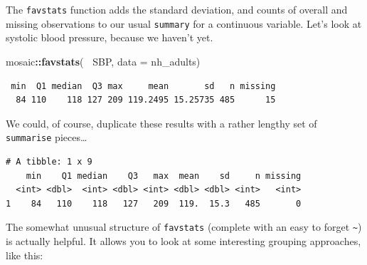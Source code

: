\documentclass[
]{book}
\newenvironment{Shaded}{\begin{snugshade}}{\end{snugshade}}
\newcommand{\DataTypeTok}[1]{\textcolor[rgb]{0.13,0.29,0.53}{#1}}
\newcommand{\FloatTok}[1]{\textcolor[rgb]{0.00,0.00,0.81}{#1}}
\newcommand{\KeywordTok}[1]{\textcolor[rgb]{0.13,0.29,0.53}{\textbf{#1}}}
\newcommand{\NormalTok}[1]{#1}
\newcommand{\OperatorTok}[1]{\textcolor[rgb]{0.81,0.36,0.00}{\textbf{#1}}}
\newcommand{\StringTok}[1]{\textcolor[rgb]{0.31,0.60,0.02}{#1}}
\begin{document}
The \texttt{favstats} function adds the standard deviation, and counts of overall and missing observations to our usual \texttt{summary} for a continuous variable. Let's look at systolic blood pressure, because we haven't yet.

\begin{Shaded}
\begin{Highlighting}[]
\NormalTok{mosaic}\OperatorTok{::}\KeywordTok{favstats}\NormalTok{(}\OperatorTok{~}\StringTok{ }\NormalTok{SBP, }\DataTypeTok{data =}\NormalTok{ nh_adults)}
\end{Highlighting}
\end{Shaded}

\begin{verbatim}
 min  Q1 median  Q3 max     mean       sd   n missing
  84 110    118 127 209 119.2495 15.25735 485      15
\end{verbatim}

We could, of course, duplicate these results with a rather lengthy set of \texttt{summarise} pieces\ldots{}

\begin{Shaded}
\end{Shaded}

\begin{verbatim}
# A tibble: 1 x 9
    min    Q1 median    Q3   max  mean    sd     n missing
  <int> <dbl>  <int> <dbl> <int> <dbl> <dbl> <int>   <int>
1    84   110    118   127   209  119.  15.3   485       0
\end{verbatim}

The somewhat unusual structure of \texttt{favstats} (complete with an easy to forget \texttt{\textasciitilde{}}) is actually helpful. It allows you to look at some interesting grouping approaches, like this:
\end{document}
